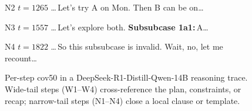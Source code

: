 \begin{figure}[t]
\begin{minipage}[c]{0.52\textwidth}
\begin{minipage}[t]{0.495\linewidth}
      \begin{nbox}{N2 \hfill $t{=}1265$}
        \dots\,Let's try A on Mon. Then B can be on\dots
      \end{nbox}\vspace{1pt}
      \begin{nbox}{N3 \hfill $t{=}1557$}
        \dots\,Let's explore both. \textbf{Subsubcase 1a1:}\,A\dots
      \end{nbox}\vspace{1pt}
      \begin{nbox}{N4 \hfill $t{=}1822$}
        \dots\,So this subsubcase is invalid. Wait, no, let me recount\dots
      \end{nbox}
    \end{minipage}
  \end{minipage}
  \caption{Per-step cov50 in a DeepSeek-R1-Distill-Qwen-14B reasoning trace.
  Wide-tail steps (W1--W4) cross-reference the plan, constraints, or recap;
  narrow-tail steps (N1--N4) close a local clause or template.}
  \label{fig:cov50}
\end{figure}
